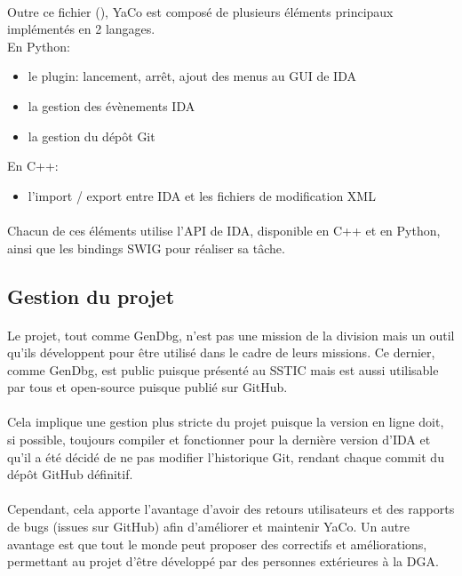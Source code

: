 \documentclass[11pt, book, english, french, standardlists]{upmethodology-document}
\begin{document}
				\paragraph*{}
					Outre ce fichier (), YaCo est composé de plusieurs éléments principaux implémentés en 2 langages.\\
					En Python:
					\begin{itemize}
						\item le plugin: lancement, arrêt, ajout des menus au \gls{GUI} de IDA
						\item la gestion des évènements IDA
						\item la gestion du dépôt Git
					\end{itemize}
					En C++:
					\begin{itemize}
						\item l'import / export entre IDA et les fichiers de modification \gls{XML}
					\end{itemize}
				\paragraph*{}
					Chacun de ces éléments utilise l'\gls{API} de IDA, disponible en C++ et en Python, ainsi que les bindings \gls{SWIG} pour réaliser sa tâche.
			\subsection{Gestion du projet}
				\paragraph*{}
					Le projet, tout comme GenDbg, n'est pas une mission de la division mais un outil qu'ils développent pour être utilisé dans le cadre de leurs missions. Ce dernier, comme GenDbg, est public puisque présenté au \gls{SSTIC}\cite{SSTICYaCo} mais est aussi utilisable par tous et open-source puisque publié sur GitHub\cite{GithubYaCo}.
				\paragraph*{}
					Cela implique une gestion plus stricte du projet puisque la version en ligne doit, si possible, toujours compiler et fonctionner pour la dernière version d'IDA et qu'il a été décidé de ne pas modifier l'historique Git, rendant chaque commit du dépôt GitHub définitif.
				\paragraph*{}
					Cependant, cela apporte l'avantage d'avoir des retours utilisateurs et des rapports de bugs (issues sur GitHub) afin d'améliorer et maintenir YaCo. Un autre avantage est que tout le monde peut proposer des correctifs et améliorations, permettant au projet d'être développé par des personnes extérieures à la \gls{DGA}.
\end{document}
